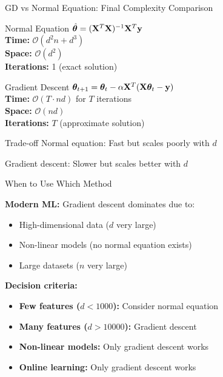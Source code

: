 \documentclass[usenames,dvipsnames]{beamer}
\begin{document}
  \begin{frame}{GD vs Normal Equation: Final Complexity Comparison}
    \begin{alertbox}{Normal Equation}
    $\hat{\boldsymbol{\theta}} = (\mathbf{X}^T\mathbf{X})^{-1}\mathbf{X}^T\mathbf{y}$
    \\\textbf{Time:} $\mathcal{O}(d^2n + d^3)$
    \\\textbf{Space:} $\mathcal{O}(d^2)$ 
    \\\textbf{Iterations:} 1 (exact solution)
    \end{alertbox}
    
    \pause
    \begin{keypointsbox}{Gradient Descent}  
    $\boldsymbol{\theta}_{t+1} = \boldsymbol{\theta}_t - \alpha \mathbf{X}^T(\mathbf{X}\boldsymbol{\theta}_t - \mathbf{y})$
    \\\textbf{Time:} $\mathcal{O}(T \cdot nd)$ for $T$ iterations
    \\\textbf{Space:} $\mathcal{O}(nd)$
    \\\textbf{Iterations:} $T$ (approximate solution)
    \end{keypointsbox}
    
    \pause
    \begin{theorembox}{Trade-off}
    Normal equation: Fast but scales poorly with $d$
    
    Gradient descent: Slower but scales better with $d$
    \end{theorembox}
  \end{frame}

  \begin{frame}{When to Use Which Method}
    \begin{keypointsbox}{}
    \textbf{Modern ML:} Gradient descent dominates due to:
    \begin{itemize}
        \item High-dimensional data ($d$ very large)
        \item Non-linear models (no normal equation exists)
        \item Large datasets ($n$ very large)
    \end{itemize}
    \end{keypointsbox}
    
    \pause
    \textbf{Decision criteria:}
    \begin{itemize}[<+->]
        \item \textbf{Few features ($d < 1000$):} Consider normal equation
        \item \textbf{Many features ($d > 10000$):} Gradient descent
        \item \textbf{Non-linear models:} Only gradient descent works
        \item \textbf{Online learning:} Only gradient descent works
    \end{itemize}
  \end{frame}
\end{document}
